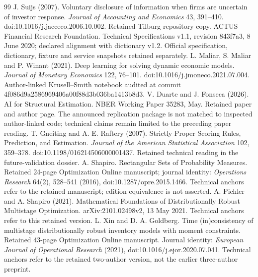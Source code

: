 \documentclass[11pt,a4paper]{article}
\begin{document}
\begin{thebibliography}{99}
 J. Suijs (2007). Voluntary disclosure of information when firms are uncertain of investor response. \emph{Journal of Accounting and Economics} 43, 391--410. doi:10.1016/j.jacceco.2006.10.002. Retained Tilburg repository copy.
 ACTUS Financial Research Foundation. Technical Specifications v1.1, revision 843f7a3, 8 June 2020; declared alignment with dictionary v1.2. Official specification, dictionary, fixture and service snapshots retained separately.
 L. Maliar, S. Maliar and P. Winant (2021). Deep learning for solving dynamic economic models. \emph{Journal of Monetary Economics} 122, 76--101. doi:10.1016/j.jmoneco.2021.07.004. Author-linked Krusell--Smith notebook audited at commit 4f086d9a2586969406a00f88d3b036ba1413b8d3.
 V. Duarte and J. Fonseca (2026). AI for Structural Estimation. NBER Working Paper 35283, May. Retained paper and author page. The announced replication package is not matched to inspected author-linked code; technical claims remain limited to the preceding paper reading.
 T. Gneiting and A. E. Raftery (2007). Strictly Proper Scoring Rules, Prediction, and Estimation. \emph{Journal of the American Statistical Association} 102, 359--378. doi:10.1198/016214506000001437. Retained technical reading in the future-validation dossier.
 A. Shapiro. Rectangular Sets of Probability Measures. Retained 24-page Optimization Online manuscript; journal identity: \emph{Operations Research} 64(2), 528--541 (2016), doi:10.1287/opre.2015.1466. Technical anchors refer to the retained manuscript; edition equivalence is not asserted.
 A. Pichler and A. Shapiro (2021). Mathematical Foundations of Distributionally Robust Multistage Optimization. arXiv:2101.02498v2, 13 May 2021. Technical anchors refer to this retained version.
 L. Xin and D. A. Goldberg. Time (in)consistency of multistage distributionally robust inventory models with moment constraints. Retained 43-page Optimization Online manuscript. Journal identity: \emph{European Journal of Operational Research} (2021), doi:10.1016/j.ejor.2020.07.041. Technical anchors refer to the retained two-author version, not the earlier three-author preprint.
\end{thebibliography}
\endgroup
\end{document}
